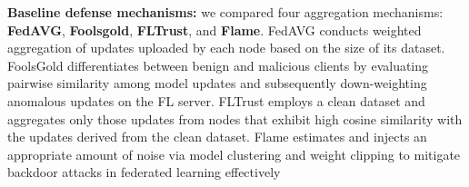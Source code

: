 \documentclass[lettersize,journal]{IEEEtran}
\begin{document}
\textbf{Baseline defense mechanisms:} 
we compared four aggregation mechanisms: \textbf{FedAVG}\cite{FedAVG}, \textbf{Foolsgold}\cite{foolsgold}, \textbf{FLTrust}\cite{FLTrust}, and \textbf{Flame}\cite{FLAME}. FedAVG conducts weighted aggregation of updates uploaded by each node based on the size of its dataset. FoolsGold differentiates between benign and malicious clients by evaluating pairwise similarity among model updates and subsequently down-weighting anomalous updates on the FL server. FLTrust employs a clean dataset and aggregates only those updates from nodes that exhibit high cosine similarity with the updates derived from the clean dataset. Flame estimates and injects an appropriate amount of noise via model clustering and weight clipping to mitigate backdoor attacks in federated learning effectively\color{black}{.}
    
\end{document}
